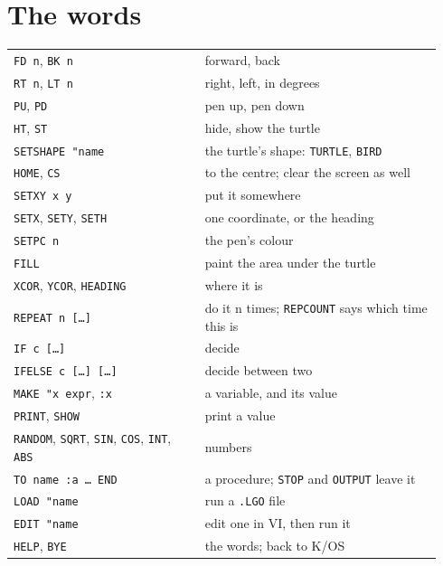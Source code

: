 \section{The words}
\begin{center}
\small
\begin{tabular}{@{}>{\raggedright\arraybackslash}p{0.42\linewidth} >{\raggedright\arraybackslash}p{0.52\linewidth}@{}}
\toprule
\texttt{FD n}, \texttt{BK n} & forward, back \\
\texttt{RT n}, \texttt{LT n} & right, left, in degrees \\
\texttt{PU}, \texttt{PD} & pen up, pen down \\
\texttt{HT}, \texttt{ST} & hide, show the turtle \\
\texttt{SETSHAPE "name} & the turtle's shape: \texttt{TURTLE}, \texttt{BIRD} \\
\texttt{HOME}, \texttt{CS} & to the centre; clear the screen as well \\
\texttt{SETXY x y} & put it somewhere \\
\texttt{SETX}, \texttt{SETY}, \texttt{SETH} & one coordinate, or the heading \\
\texttt{SETPC n} & the pen's colour \\
\texttt{FILL} & paint the area under the turtle \\
\texttt{XCOR}, \texttt{YCOR}, \texttt{HEADING} & where it is \\
\texttt{REPEAT n [\ldots]} & do it n times; \texttt{REPCOUNT} says which time this is \\
\texttt{IF c [\ldots]} & decide \\
\texttt{IFELSE c [\ldots] [\ldots]} & decide between two \\
\texttt{MAKE "x expr}, \texttt{:x} & a variable, and its value \\
\texttt{PRINT}, \texttt{SHOW} & print a value \\
\texttt{RANDOM}, \texttt{SQRT}, \texttt{SIN}, \texttt{COS}, \texttt{INT}, \texttt{ABS} & numbers \\
\texttt{TO name :a \ldots{} END} & a procedure; \texttt{STOP} and \texttt{OUTPUT} leave it \\
\texttt{LOAD "name} & run a \texttt{.LGO} file \\
\texttt{EDIT "name} & edit one in VI, then run it \\
\texttt{HELP}, \texttt{BYE} & the words; back to K/OS \\
\bottomrule
\end{tabular}
\end{center}

